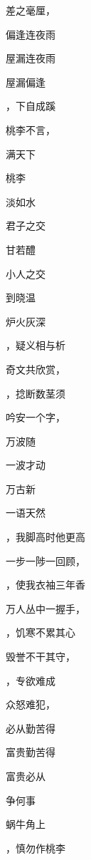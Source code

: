 \documentclass[12pt, a4paper, addpoints, answers]{exam}
\begin{document}
\begin{multicols}{2}
\begin{questions}
\question[2] 差之毫厘，\fillin 

\question[2] \fillin 偏逢连夜雨

\question[2] 屋漏\fillin 连夜雨

\question[2] 屋漏偏逢\fillin 

\question[2] \fillin ，下自成蹊

\question[2] 桃李不言，\fillin 

\question[2] \fillin 满天下

\question[2] 桃李\fillin 

\question[2] \fillin 淡如水

\question[2] 君子之交\fillin 

\question[2] \fillin 甘若醴

\question[2] 小人之交\fillin 

\question[2] \fillin 到晓温

\question[2] 炉火灰深\fillin 

\question[2] \fillin ，疑义相与析

\question[2] 奇文共欣赏，\fillin 

\question[2] \fillin ，捻断数茎须

\question[2] 吟安一个字，\fillin 

\question[2] \fillin 万波随

\question[2] 一波才动\fillin 

\question[2] \fillin 万古新

\question[2] 一语天然\fillin 

\question[2] \fillin ，我脚高时他更高

\question[2] 一步一陟一回顾，\fillin 

\question[2] \fillin ，使我衣袖三年香

\question[2] 万人丛中一握手，\fillin 

\question[2] \fillin ，饥寒不累其心

\question[2] 毁誉不干其守，\fillin 

\question[2] \fillin ，专欲难成

\question[2] 众怒难犯，\fillin 

\question[2] \fillin 必从勤苦得

\question[2] 富贵\fillin 勤苦得

\question[2] 富贵必从\fillin 

\question[2] \fillin 争何事

\question[2] 蜗牛角上\fillin 

\question[2] \fillin ，慎勿作桃李


\end{questions}
\end{multicols}
\end{document}
